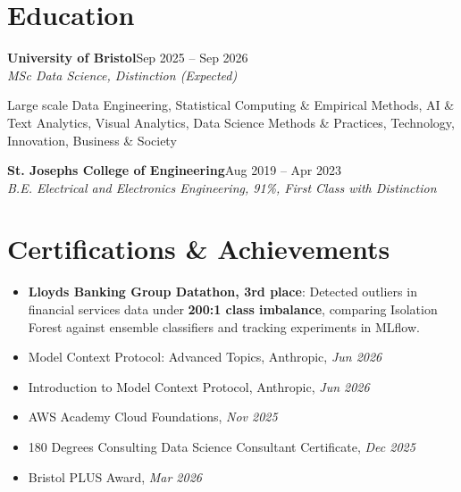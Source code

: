 \documentclass[a4paper,11pt]{article}
\newcommand{\roleNoLoc}[3]{\textbf{#1}\hfill{\color{muted}#2}\\ \textit{#3}\par}
\newcommand{\gap}{\vspace{5pt}}
\newcommand{\num}[1]{\textbf{#1}}   %
\begin{document}
\section{Education}
\roleNoLoc{University of Bristol}{Sep 2025 – Sep 2026}{MSc Data Science, Distinction \textit{(Expected)}}
{\color{muted}\small Large scale Data Engineering, Statistical Computing \& Empirical Methods, AI \& Text Analytics, Visual Analytics, Data Science Methods \& Practices, Technology, Innovation, Business \& Society}\par
\gap
{}
\roleNoLoc{St. Joseph\textquotesingle{}s College of Engineering}{Aug 2019 – Apr 2023}{B.E. Electrical and Electronics Engineering, 91\%, First Class with Distinction}

\section{Certifications \& Achievements}
\begin{itemize}
  \item \textbf{Lloyd\textquotesingle{}s Banking Group Datathon, 3rd place}: Detected outliers in financial services data under \num{200:1 class imbalance}, comparing Isolation Forest against ensemble classifiers and tracking experiments in MLflow.
  \item Model Context Protocol: Advanced Topics, Anthropic, \textit{Jun 2026}
  \item Introduction to Model Context Protocol, Anthropic, \textit{Jun 2026}
  \item AWS Academy Cloud Foundations, \textit{Nov 2025}
  \item 180 Degrees Consulting Data Science Consultant Certificate, \textit{Dec 2025}
  \item Bristol PLUS Award, \textit{Mar 2026}
\end{itemize}
\end{document}
